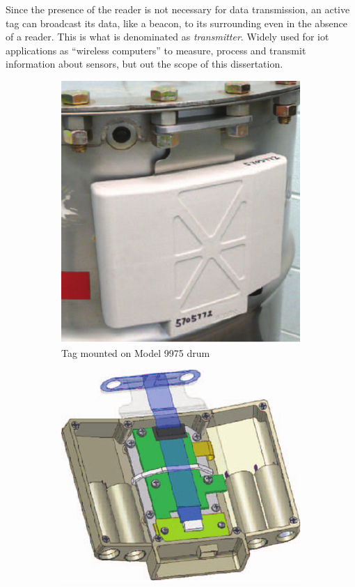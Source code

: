 Since the presence of the reader is not necessary for data transmission, an active tag can broadcast its data, like a beacon, to its surrounding even in the absence of a reader. This is what is denominated as \emph{transmitter}.
Widely used for \ac{iot} applications as ``wireless computers'' to measure, process and transmit information about sensors, but out the scope of this dissertation. 

\begin{figure}[!ht]
    \centering
    \begin{subfigure}{.4\textwidth}
        \centering
        \includegraphics[width=.8\linewidth]{./figs/02-state-of-the-art/active_tag1.pdf}
        \caption{Tag mounted on Model 9975 drum}
        \label{fig:activetagsub1}
    \end{subfigure}
    \begin{subfigure}{.4\textwidth}
        \centering
        \includegraphics[width=0.95\linewidth]{./figs/02-state-of-the-art/active_tag2.pdf}

\end{subfigure}
\end{figure}
